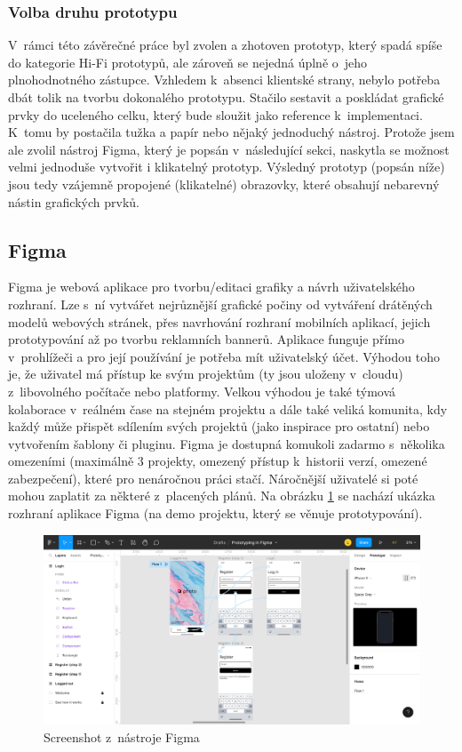 \documentclass[thesis=M,czech]{FITthesis}[2019/12/23]
\begin{document}
\subsubsection{Volba druhu prototypu}
V~rámci této závěrečné práce byl zvolen a zhotoven prototyp, který spadá spíše do kategorie Hi-Fi prototypů, ale zároveň se nejedná úplně o~jeho plnohodnotného zástupce. Vzhledem k~absenci klientské strany, nebylo potřeba dbát tolik na tvorbu dokonalého prototypu. Stačilo sestavit a poskládat grafické prvky do uceleného celku, který bude sloužit jako reference k~implementaci. K~tomu by postačila tužka a papír nebo nějaký jednoduchý nástroj. Protože jsem ale zvolil nástroj Figma, který je popsán v~následující sekci, naskytla se možnost velmi jednoduše vytvořit i klikatelný prototyp. Výsledný prototyp (popsán níže) jsou tedy vzájemně propojené (klikatelné) obrazovky, které obsahují nebarevný nástin grafických prvků.

\subsection{Figma}
Figma je webová aplikace pro tvorbu/editaci grafiky a návrh uživatelského rozhraní. Lze s~ní vytvářet nejrůznější grafické počiny od vytváření drátěných modelů webových stránek, přes navrhování rozhraní mobilních aplikací, jejich prototypování až po tvorbu reklamních bannerů. Aplikace funguje přímo v~prohlížeči a pro její používání je potřeba mít uživatelský účet. Výhodou toho je, že uživatel má přístup ke svým projektům (ty jsou uloženy v~cloudu) z~libovolného počítače nebo platformy. Velkou výhodou je také týmová kolaborace v~reálném čase na stejném projektu a dále také veliká komunita, kdy každý může přispět sdílením svých projektů (jako inspirace pro ostatní) nebo vytvořením šablony či pluginu. Figma je dostupná komukoli zadarmo s~několika omezeními (maximálně 3 projekty, omezený přístup k~historii verzí, omezené zabezpečení), které pro nenáročnou práci stačí. Náročnější uživatelé si poté mohou zaplatit za některé z~placených plánů. Na obrázku \ref{img:figma-screenshot} se nachází ukázka rozhraní aplikace Figma (na demo projektu, který se věnuje prototypování). \cite{figma}

\begin{figure}
	\centering
	\includegraphics[width=1\linewidth]{images/figma-screenshot.png}
  	\caption{Screenshot z~nástroje Figma}
  	\label{img:figma-screenshot}
\end{figure}
\end{document}
